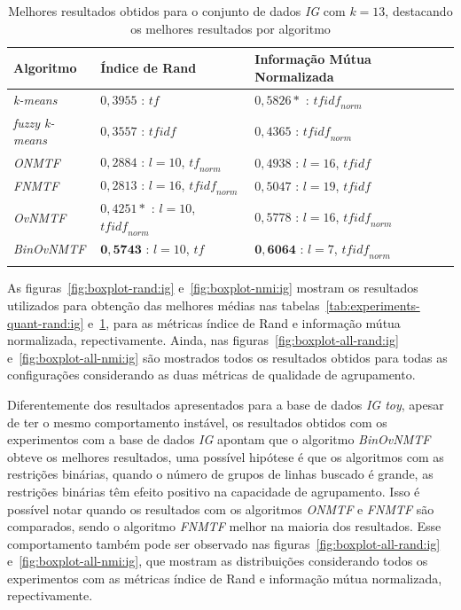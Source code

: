 \documentclass[
    12pt,                %
    oneside,            %
    a4paper,            %
    english,            %
    brazil                %
    ]{abntex2ppgsi}
\begin{document}
\begin{table}[H]
\centering
    \caption{Melhores resultados obtidos para o conjunto de dados \textit{IG} com $k = 13$, destacando os melhores resultados por algoritmo}
    \begin{tabular}{lll}
        \hline
        \textbf{Algoritmo} & \textbf{Índice de Rand} & \textbf{Informação Mútua Normalizada} \\
        \hline
        \textit{k-means}       & $0,3955$ : $\textit{tf}$                     & $0,5826*$ : $\textit{tfidf}_{norm}$ \\
        \textit{fuzzy k-means} & $0,3557$ : $\textit{tfidf}$                  & $0,4365$ : $\textit{tfidf}_{norm}$ \\
        \textit{ONMTF}         & $0,2884$ : $l=10$, $\textit{tf}_{norm}$      & $0,4938$ : $l=16$, $\textit{tfidf}$ \\
        \textit{FNMTF}         & $0,2813$ : $l=16$, $\textit{tfidf}_{norm}$   & $0,5047$ : $l=19$, $\textit{tfidf}$ \\
        \textit{OvNMTF}        & $0,4251*$ : $l=10$, $\textit{tfidf}_{norm}$  & $0,5778$ : $l=16$, $\textit{tfidf}_{norm}$ \\
        \textit{BinOvNMTF}     & $\mathbf{0,5743}$ : $l=10$, $\textit{tf}$    & $\mathbf{0,6064}$ : $l=7$, $\textit{tfidf}_{norm}$ \\
        \hline \\
    \end{tabular}
    \label{tab:experiments-quant-best-nmi:ig}
\end{table}

As figuras~\ref{fig:boxplot-rand:ig} e~\ref{fig:boxplot-nmi:ig} mostram os resultados utilizados para obtenção das melhores médias nas tabelas~\ref{tab:experiments-quant-rand:ig} e~\ref{tab:experiments-quant-best-nmi:ig}, para as métricas índice de Rand e informação mútua normalizada, repectivamente.
Ainda, nas figuras~\ref{fig:boxplot-all-rand:ig} e~\ref{fig:boxplot-all-nmi:ig} são mostrados todos os resultados obtidos para todas as configurações considerando as duas métricas de qualidade de agrupamento.

Diferentemente dos resultados apresentados para a base de dados \textit{IG toy}, apesar de ter o mesmo comportamento instável, os resultados obtidos com os experimentos com a base de dados \textit{IG} apontam que o algoritmo \textit{BinOvNMTF} obteve os melhores resultados, uma possível hipótese é que os algoritmos com as restrições binárias, quando o número de grupos de linhas buscado é grande, as restrições binárias têm efeito positivo na capacidade de agrupamento.
Isso é possível notar quando os resultados com os algoritmos \textit{ONMTF} e \textit{FNMTF} são comparados, sendo o algoritmo \textit{FNMTF} melhor na maioria dos resultados.
Esse comportamento também pode ser observado nas figuras~\ref{fig:boxplot-all-rand:ig} e~\ref{fig:boxplot-all-nmi:ig}, que mostram as distribuições considerando todos os experimentos com as métricas índice de Rand e informação mútua normalizada, repectivamente.
\end{document}
